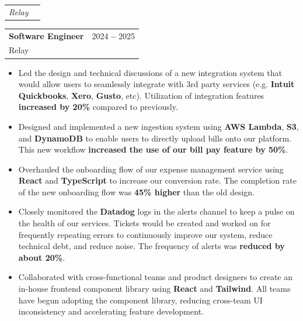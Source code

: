 \documentclass[letterpaper,10pt]{article}
\makeatletter
\newcommand{\resumeItem}[1]{
  \item\small{
    {#1 \vspace{-2pt}}
  }
}
\newcommand{\resumeSubheading}[4]{
  \vspace{-2pt}\item
    \ifthenelse{\equal{#1}{}}
    {
    \begin{tabular*}{0.97\textwidth}[t]{l@{\extracolsep{\fill}}r}
      \textit{\small#3} & \textit{\small #4} \\
    \end{tabular*}\vspace{-7pt}
    }
    {
    \begin{tabular*}{0.97\textwidth}[t]{l@{\extracolsep{\fill}}r}
      \textbf{#1} & \small{#2} \\
      \small#3 & \small#4 \\
    \end{tabular*}\vspace{-7pt}
    }
}
\newcommand{\resumeItemListStart}{\begin{itemize}}
\newcommand{\resumeItemListEnd}{\end{itemize}\vspace{-5pt}}
\makeatother
\begin{document}
    \resumeSubheading
      {Software Engineer}{2024 \textbf{--} 2025}
      {Relay}{}
        \resumeItemListStart
            \resumeItem{Led the design and technical discussions of a new integration system that would allow users to seamlessly integrate with 3rd party services (e.g. \textbf{Intuit Quickbooks}, \textbf{Xero}, \textbf{Gusto}, etc). Utilization of integration features \textbf{increased by 20\%} compared to previously.}
            \resumeItem{Designed and implemented a new ingestion system using \textbf{AWS Lambda}, \textbf{S3}, and \textbf{DynamoDB} to enable users to directly upload bills onto our platform. This new workflow \textbf{increased the use of our bill pay feature by 50\%}.}
            \resumeItem{Overhauled the onboarding flow of our expense management service using \textbf{React} and \textbf{TypeScript} to increase our conversion rate. The completion rate of the new onboarding flow was \textbf{45\% higher} than the old design.}
            \resumeItem{Closely monitored the \textbf{Datadog} logs in the alerts channel to keep a pulse on the health of our services. Tickets would be created and worked on for frequently repeating errors to continuously improve our system, reduce technical debt, and reduce noise. The frequency of alerts was \textbf{reduced by about 20\%}.}
            \resumeItem{Collaborated with cross-functional teams and product designers to create an in-house frontend component library using \textbf{React} and \textbf{Tailwind}. All teams have begun adopting the component library, reducing cross-team UI inconsistency and accelerating feature development.}
        \resumeItemListEnd
\end{document}
